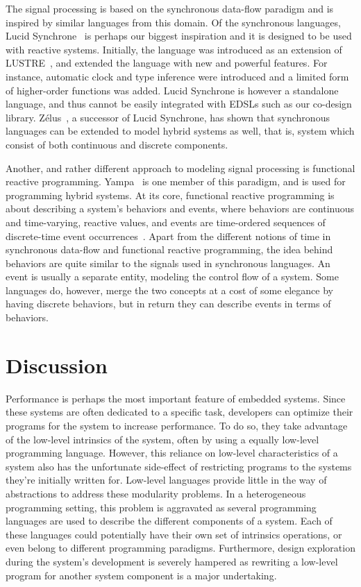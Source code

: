 \documentclass[../paper.tex]{subfiles}
\begin{document}
The signal processing is based on the synchronous data-flow paradigm and is inspired by similar languages from this domain. Of the synchronous languages, Lucid Synchrone~\cite{pouzet2006, colaco2004} is perhaps our biggest inspiration and it is designed to be used with reactive systems. Initially, the language was introduced as an extension of LUSTRE~\cite{hu1998}, and extended the language with new and powerful features. For instance, automatic clock and type inference were introduced and a limited form of higher-order functions was added. Lucid Synchrone is however a standalone language, and thus cannot be easily integrated with EDSLs such as our co-design library. Z{\'e}lus~\cite{zelus2013}, a successor of Lucid Synchrone, has shown that synchronous languages can be extended to model hybrid systems as well, that is, system which consist of both continuous and discrete components.

Another, and rather different approach to modeling signal processing is functional reactive programming. Yampa~\cite{yampa2003} is one member of this paradigm, and is used for programming hybrid systems. At its core, functional reactive programming is about describing a system's behaviors and events, where behaviors are continuous and time-varying, reactive values, and events are time-ordered sequences of discrete-time event occurrences~\cite{nilsson2002}. Apart from the different notions of time in synchronous data-flow and functional reactive programming, the idea behind behaviors are quite similar to the signals used in synchronous languages. An event is usually a separate entity, modeling the control flow of a system. Some languages do, however, merge the two concepts at a cost of some elegance by having discrete behaviors, but in return they can describe events in terms of behaviors.

\section{Discussion}
\label{disc}

Performance is perhaps the most important feature of embedded systems. Since these systems are often dedicated to a specific task, developers can optimize their programs for the system to increase performance. To do so, they take advantage of the low-level intrinsics of the system, often by using a equally low-level programming language. However, this reliance on low-level characteristics of a system also has the unfortunate side-effect of restricting programs to the systems they're initially written for. Low-level languages provide little in the way of abstractions to address these modularity problems. In a heterogeneous programming setting, this problem is aggravated as several programming languages are used to describe the different components of a system. Each of these languages could potentially have their own set of intrinsics operations, or even belong to different programming paradigms. Furthermore, design exploration during the system's development is severely hampered as rewriting a low-level program for another system component is a major undertaking.
\end{document}
